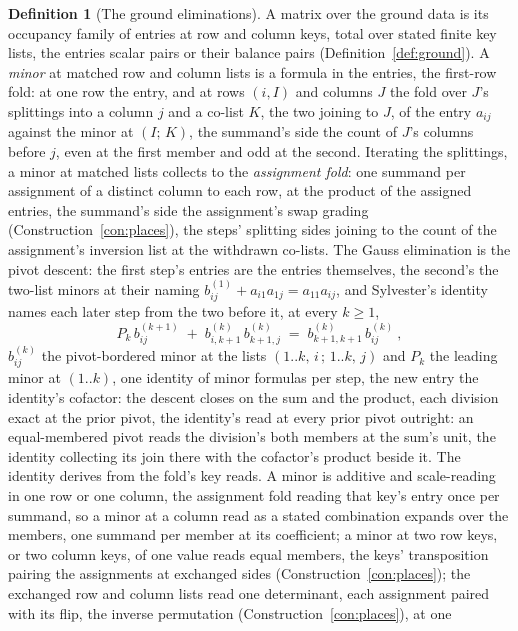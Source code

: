 \documentclass[11pt]{article}
\theoremstyle{definition}
\newtheorem{definition}{Definition}
\begin{document}
\begin{definition}[The ground eliminations]\label{def:elim}
A matrix over the ground data is its occupancy family of entries
at row and column keys, total over stated finite key lists, the
entries scalar pairs or their balance pairs
(Definition~\ref{def:ground}). A \emph{minor} at matched row and
column lists is a formula in the entries, the first-row fold: at
one row the entry, and at rows $(i,I)$ and columns $J$ the fold
over $J$'s splittings into a column $j$ and a
co-list $K$, the two joining to $J$, of the entry $a_{ij}$ against
the minor at $(I;\,K)$, the summand's side
the count of $J$'s columns before $j$, even at the first member
and odd at the second. Iterating the splittings, a minor at
matched lists collects to the \emph{assignment fold}: one summand
per assignment of a distinct column to each row, at the product of
the assigned entries, the summand's side the assignment's swap
grading (Construction~\ref{con:places}), the steps' splitting
sides joining to the count of the assignment's inversion list at
the withdrawn co-lists. The Gauss elimination is the pivot
descent: the first step's entries are
the entries themselves,
the second's the two-list minors at their naming
$b^{(1)}_{ij}+a_{i1}a_{1j}=a_{11}a_{ij}$, and Sylvester's
identity names each later step from the two before it, at every
$k\ge1$,
\[
P_{k}\,b^{(k+1)}_{ij}\;+\;b^{(k)}_{i,k+1}\,b^{(k)}_{k+1,j}
\;=\;b^{(k)}_{k+1,k+1}\,b^{(k)}_{ij}\ ,
\]
$b^{(k)}_{ij}$ the pivot-bordered minor at the lists
$(1..k,\,i\,;\,1..k,\,j)$ and $P_{k}$ the leading minor at
$(1..k)$, one
identity of minor formulas per step, the new entry the
identity's
cofactor: the descent closes on the sum and the product, each
division exact at the prior pivot, the identity's read at every
prior pivot outright: an equal-membered pivot reads the
division's both members at the sum's unit, the identity
collecting its join there with the cofactor's product beside
it. The
identity derives from the fold's key reads. A minor is additive
and scale-reading in one row or one column, the assignment fold
reading that key's entry once per summand, so a minor at a column
read as a stated combination expands over the members, one
summand per member at its coefficient; a minor at two row keys,
or two column keys, of one value reads equal members, the keys'
transposition pairing the assignments at exchanged sides
(Construction~\ref{con:places}); the exchanged row and column
lists read one determinant, each assignment paired with its flip,
the inverse permutation (Construction~\ref{con:places}), at one

\end{definition}
\end{document}
